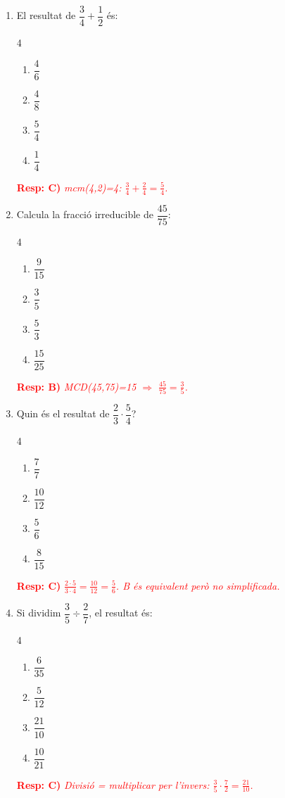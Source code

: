 \documentclass[a4paper, 11pt]{article}
\begin{document}
\begin{enumerate}[label=\textbf{\arabic*.}, itemsep=0.8em]
    \item El resultat de $\dfrac{3}{4} + \dfrac{1}{2}$ és:
    \begin{multicols}{4}
    \begin{enumerate}[label=\textbf{\Alph*)}, itemsep=0.3em]
        \item $\dfrac{4}{6}$ \item $\dfrac{4}{8}$ \item $\dfrac{5}{4}$ \item $\dfrac{1}{4}$
    \end{enumerate}
    \end{multicols}
    \textcolor{red}{\textbf{Resp: C)} \textit{mcm(4,2)=4: $\frac{3}{4}+\frac{2}{4}=\frac{5}{4}$.}}

    \item Calcula la fracció irreducible de $\dfrac{45}{75}$:
    \begin{multicols}{4}
    \begin{enumerate}[label=\textbf{\Alph*)}, itemsep=0.3em]
        \item $\dfrac{9}{15}$ \item $\dfrac{3}{5}$ \item $\dfrac{5}{3}$ \item $\dfrac{15}{25}$
    \end{enumerate}
    \end{multicols}
    \textcolor{red}{\textbf{Resp: B)} \textit{MCD(45,75)=15 $\Rightarrow$ $\frac{45}{75}=\frac{3}{5}$.}}

    \item Quin és el resultat de $\dfrac{2}{3} \cdot \dfrac{5}{4}$?
    \begin{multicols}{4}
    \begin{enumerate}[label=\textbf{\Alph*)}, itemsep=0.3em]
        \item $\dfrac{7}{7}$ \item $\dfrac{10}{12}$ \item $\dfrac{5}{6}$ \item $\dfrac{8}{15}$
    \end{enumerate}
    \end{multicols}
    \textcolor{red}{\textbf{Resp: C)} \textit{$\frac{2\cdot5}{3\cdot4}=\frac{10}{12}=\frac{5}{6}$. B és equivalent però no simplificada.}}

    \item Si dividim $\dfrac{3}{5} \div \dfrac{2}{7}$, el resultat és:
    \begin{multicols}{4}
    \begin{enumerate}[label=\textbf{\Alph*)}, itemsep=0.3em]
        \item $\dfrac{6}{35}$ \item $\dfrac{5}{12}$ \item $\dfrac{21}{10}$ \item $\dfrac{10}{21}$
    \end{enumerate}
    \end{multicols}
    \textcolor{red}{\textbf{Resp: C)} \textit{Divisió = multiplicar per l'invers: $\frac{3}{5}\cdot\frac{7}{2}=\frac{21}{10}$.}}


\end{enumerate}
\end{document}
